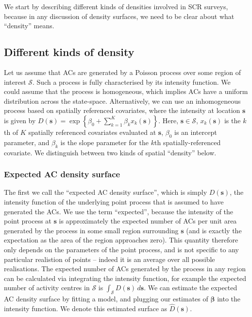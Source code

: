 \documentclass[useAMS,usenatbib,referee]{biom}
\begin{document}
We start by describing different kinds of densities involved in SCR surveys, because in any discussion of density surfaces, we need to be clear about what ``density'' means. 

\subsection{Different kinds of density}\label{different-densities}

Let us assume that ACs are generated by a Poisson process over some region of interest $\mathcal{S}$. Such a process is fully characterised by its intensity function. We could assume that the process is homogeneous, which implies ACs have a uniform distribution across the state-space. Alternatively, we can use an inhomogeneous process based on spatially referenced covariates, where the intensity at location $\bm{s}$ is given by $D(\bm{s})=\exp\left\{\beta_0 + \sum_{k=1}^K\beta_kx_k(\bm{s})\right\}$. Here, $\bm{s} \in \mathcal{S}$, $x_k(\bm{s})$ is the $k$th of $K$ spatially referenced covariates evaluated at $\bm{s}$, $\beta_0$ is an intercept parameter, and $\beta_k$ is the slope parameter for the $k$th spatially-referenced covariate. We distinguish between two kinds of spatial ``density'' below.

\subsubsection{Expected AC density surface} \label{s:eacd}

The first we call the ``expected AC density surface'', which is simply $D(\bm{s})$, the intensity function of the underlying point process that is assumed to have generated the ACs. We use the term ``expected'', because the intensity of the point process at $\bm{s}$ is approximately the expected number of ACs per unit area generated by the process in some small region surrounding $\bm{s}$ (and is exactly the expectation as the area of the region approaches zero). This quantity therefore only depends on the parameters of the point process, and is not specific to any particular realistion of points -- indeed it is an average over all possible realisations. The expected number of ACs generated by the process in any region can be calculated via integrating the intensity function, for example the expected number of activity centres in $\mathcal{S}$ is $\int_{\mathcal{S}} D(\bm{s}) \, d\bm{s}$. We can estimate the expected AC density surface by fitting a model, and plugging our estimates of $\bm{\beta}$ into the intensity
function. We denote this estimated surface as $\widehat{D}(\bm{s})$. 
\end{document}
